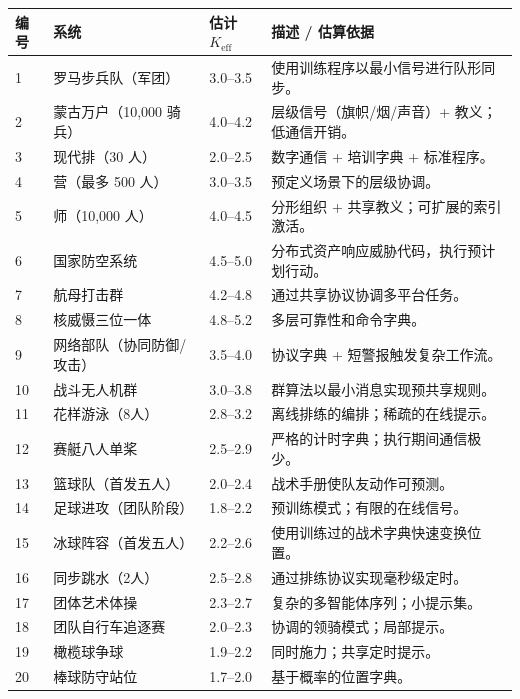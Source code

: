 \documentclass[11pt,a4paper]{article}
\begin{document}
\begin{longtable}{|p{0.8cm}|p{6.2cm}|p{3.0cm}|p{5.7cm}|}
	\hline
	\textbf{编号} & \textbf{系统} & \textbf{估计 $K_{\mathrm{eff}}$} & \textbf{描述 / 估算依据} \\
	\hline
	\endhead
	1 & 罗马步兵队（军团） & 3.0--3.5 & 使用训练程序以最小信号进行队形同步。 \\
	\hline
	2 & 蒙古万户（10,000 骑兵） & 4.0--4.2 & 层级信号（旗帜/烟/声音）+ 教义；低通信开销。 \\
	\hline
	3 & 现代排（30 人） & 2.0--2.5 & 数字通信 + 培训字典 + 标准程序。 \\
	\hline
	4 & 营（最多 500 人） & 3.0--3.5 & 预定义场景下的层级协调。 \\
	\hline
	5 & 师（10,000 人） & 4.0--4.5 & 分形组织 + 共享教义；可扩展的索引激活。 \\
	\hline
	6 & 国家防空系统 & 4.5--5.0 & 分布式资产响应威胁代码，执行预计划行动。 \\
	\hline
	7 & 航母打击群 & 4.2--4.8 & 通过共享协议协调多平台任务。 \\
	\hline
	8 & 核威慑三位一体 & 4.8--5.2 & 多层可靠性和命令字典。 \\
	\hline
	9 & 网络部队（协同防御/攻击） & 3.5--4.0 & 协议字典 + 短警报触发复杂工作流。 \\
	\hline
	10 & 战斗无人机群 & 3.0--3.8 & 群算法以最小消息实现预共享规则。 \\
	\hline
	11 & 花样游泳（8人） & 2.8--3.2 & 离线排练的编排；稀疏的在线提示。 \\
	\hline
	12 & 赛艇八人单桨 & 2.5--2.9 & 严格的计时字典；执行期间通信极少。 \\
	\hline
	13 & 篮球队（首发五人） & 2.0--2.4 & 战术手册使队友动作可预测。 \\
	\hline
	14 & 足球进攻（团队阶段） & 1.8--2.2 & 预训练模式；有限的在线信号。 \\
	\hline
	15 & 冰球阵容（首发五人） & 2.2--2.6 & 使用训练过的战术字典快速变换位置。 \\
	\hline
	16 & 同步跳水（2人） & 2.5--2.8 & 通过排练协议实现毫秒级定时。 \\
	\hline
	17 & 团体艺术体操 & 2.3--2.7 & 复杂的多智能体序列；小提示集。 \\
	\hline
	18 & 团队自行车追逐赛 & 2.0--2.3 & 协调的领骑模式；局部提示。 \\
	\hline
	19 & 橄榄球争球 & 1.9--2.2 & 同时施力；共享定时提示。 \\
	\hline
	20 & 棒球防守站位 & 1.7--2.0 & 基于概率的位置字典。 \\

\end{longtable}
\end{document}
